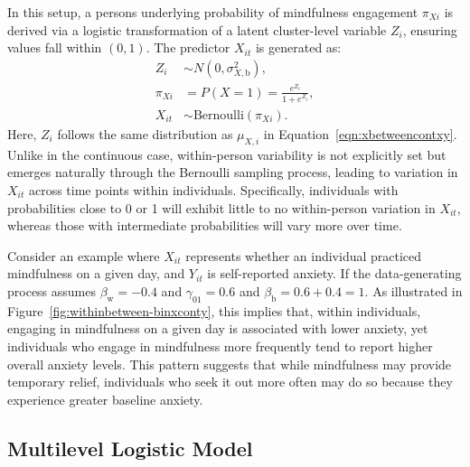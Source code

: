 \documentclass[stu]{apa7}
\begin{document}
In this setup, a persons underlying probability of mindfulness engagement \( \pi_{Xi} \) is derived via a logistic transformation of a latent cluster-level variable \( Z_i \), ensuring values fall within \( (0,1) \). The predictor \( X_{it} \) is generated as:
\begin{align}
\label{eqn:binxconty-Xgeneration1}
Z_{i} &\sim N(0, \sigma^2_{X,\text{b}}), \\
\label{eqn:binxconty-Xgeneration2}
\pi_{Xi} &= P(X =1) = \frac{e^{Z_i}}{1+ e^{Z_i}}, \\
\label{eqn:binxconty-Xgeneration3}
X_{it} &\sim \text{Bernoulli}(\pi_{Xi}).
\end{align}
Here, \( Z_i \) follows the same distribution as \( \mu_{X,i} \) in Equation~\ref{eqn:xbetweencontxy}. Unlike in the continuous case, within-person variability is not explicitly set but emerges naturally through the Bernoulli sampling process, leading to variation in \( X_{it} \) across time points within individuals. Specifically, individuals with probabilities close to 0 or 1 will exhibit little to no within-person variation in \( X_{it} \), whereas those with intermediate probabilities will vary more over time.

Consider an example where \(X_{it}\) represents whether an individual practiced mindfulness on a given day, and \(Y_{it}\) is self-reported anxiety. If the data-generating process assumes \(\beta_\text{w} = -0.4\) and \(\gamma_{01} = 0.6\) and \(\beta_\text{b} = 0.6 + 0.4 = 1\). As illustrated in Figure~\ref{fig:withinbetween-binxconty}, this implies that, within individuals, engaging in mindfulness on a given day is associated with lower anxiety, yet individuals who engage in mindfulness more frequently tend to report higher overall anxiety levels. This pattern suggests that while mindfulness may provide temporary relief, individuals who seek it out more often may do so because they experience greater baseline anxiety.



\subsection{Multilevel Logistic Model}
\end{document}
